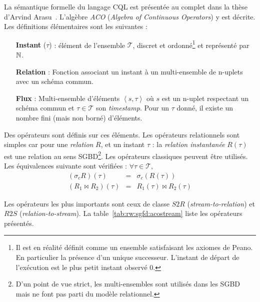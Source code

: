 La sémantique formelle du langage CQL est présentée au complet dans la thèse d'Arvind Arasu~\cite{Arasu:queries}. L'algèbre \textit{ACO} (\textit{Algebra of Continuous Operators}) y est décrite. Les définitions élémentaires sont les suivantes :
\begin{itemize}
 \item[\textbf{Instant} ($\tau$)] : élément de l'ensemble $\mathcal T$, discret et ordonné\footnote{Il est en réalité définit comme un ensemble satisfaisant les axiomes de Peano. En particulier la présence d'un unique successeur. L'instant de départ de l'exécution est le plus petit instant observé $0$.} et représenté par $\mathbb{N}$.
 \item[\textbf{Relation}] : Fonction associant un instant à un multi-ensemble de n-uplets avec un schéma commun.
 \item[\textbf{Flux}] : Multi-ensemble d'éléments $\left<s,\tau\right>$ où $s$ est un n-uplet respectant un schéma commun et $\tau \in \mathcal T$ son \textit{timestamp}. Pour un $\tau$ donné, il existe un nombre fini (mais non borné) d'éléments.
\end{itemize}
Des opérateurs sont définis sur ces éléments. Les opérateurs relationnels sont simples car pour une \textit{relation} $R$, et un instant $\tau$ : la \textit{relation instantanée} $R(\tau)$ est une relation au sens SGBD\footnote{D'un point de vue strict, les multi-ensembles sont utilisés dans les SGBD mais ne font pas parti du modèle relationnel.}. Les opérateurs classiques peuvent être utilisés. Les équivalences suivante sont vérifiées : $\forall \tau\in\mathcal T,$ 
\begin{eqnarray*}
    (\sigma_c R)(\tau) & = & \sigma_c(R(\tau))\\
    (R_1 \Join R_2)(\tau) & = & R_1(\tau) \Join R_2(\tau)
\end{eqnarray*}

Les opérateurs les plus importants sont ceux de classe $S2R$ (\textit{stream-to-relation}) et $R2S$ (\textit{relation-to-stream}). La table~\ref{tab:rw:sgfd:acostream} liste les opérateurs présentés.
 
